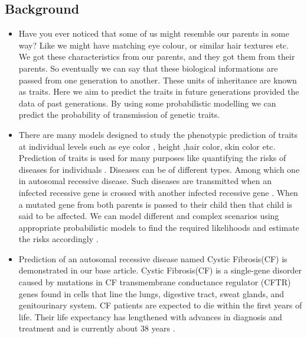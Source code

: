\documentclass{article}
\begin{document}
\subsection{Background}
\begin{itemize}
    \item Have you ever noticed that some of us might resemble our parents in some way? Like we might have matching eye colour, or similar hair textures etc. We got these characteristics from our parents, and they got them from their parents. So eventually we can say that these biological informations are passed from one generation to another. These units of inheritance are known as traits. Here we aim to predict the traits in future generations provided the data of past generations. By using some probabilistic modelling we can predict the probability of transmission of genetic traits.   	
    
    \item There are many models designed to study the phenotypic prediction of traits at individual levels such as eye color \cite{hart2013improved}, height\cite{dubois2012genetic} ,hair color, skin color \cite{liu2015genetics} etc. Prediction of traits is used for many purposes like quantifying the risks of diseases for individuals\cite{mclaren2016privacy} \cite{yi2011bayesian} \cite{wijeysundera2011predicting} \cite{farrer1997effects} . Diseases can be of different types. Among which one in autosomal recessive disease. Such diseases are transmitted when an infected recessive gene is crossed with another infected recessive gene . When a mutated gene from both parents is passed to their child then that child is said to be affected. We can model different and complex scenarios using appropriate probabilistic models to find the required likelihoods and estimate the risks accordingly \cite{ogino2004bayesian}. 
    \item Prediction of  an autosomal recessive disease named Cystic Fibrosis(CF)\cite{drumm2012genetic} is demonstrated in our base article. Cystic Fibrosis(CF) is a single-gene disorder caused by mutations in CF transmembrane conductance regulator (CFTR) genes found in cells that line the lungs, digestive tract, sweat glands, and genitourinary system. CF patients are expected to die within the first years of life. Their life expectancy has lengthened with advances in diagnosis and treatment and is currently about 38 years \cite{jackson2011validation}. 
    
\end{itemize}
\end{document}
